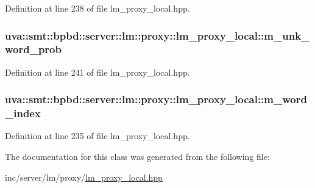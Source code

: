 Definition at line 238 of file lm\+\_\+proxy\+\_\+local.\+hpp.

\hypertarget{classuva_1_1smt_1_1bpbd_1_1server_1_1lm_1_1proxy_1_1lm__proxy__local_a429b9054d6edfc673d541cb957b52690}{}
\subsubsection[{m\+\_\+unk\+\_\+word\+\_\+prob}]{ uva\+::smt\+::bpbd\+::server\+::lm\+::proxy\+::lm\+\_\+proxy\+\_\+local\+::m\+\_\+unk\+\_\+word\+\_\+prob\hspace{0.3cm}{\ttfamily [protected]}}\label{classuva_1_1smt_1_1bpbd_1_1server_1_1lm_1_1proxy_1_1lm__proxy__local_a429b9054d6edfc673d541cb957b52690}


Definition at line 241 of file lm\+\_\+proxy\+\_\+local.\+hpp.

\hypertarget{classuva_1_1smt_1_1bpbd_1_1server_1_1lm_1_1proxy_1_1lm__proxy__local_a52e51098548cbedd08af9b5b6fc897c8}{}
\subsubsection[{m\+\_\+word\+\_\+index}]{ uva\+::smt\+::bpbd\+::server\+::lm\+::proxy\+::lm\+\_\+proxy\+\_\+local\+::m\+\_\+word\+\_\+index\hspace{0.3cm}{\ttfamily [protected]}}\label{classuva_1_1smt_1_1bpbd_1_1server_1_1lm_1_1proxy_1_1lm__proxy__local_a52e51098548cbedd08af9b5b6fc897c8}


Definition at line 235 of file lm\+\_\+proxy\+\_\+local.\+hpp.



The documentation for this class was generated from the following file\+:\begin{DoxyCompactItemize}
\item 
inc/server/lm/proxy/\hyperlink{lm__proxy__local_8hpp}{lm\+\_\+proxy\+\_\+local.\+hpp}\end{DoxyCompactItemize}
